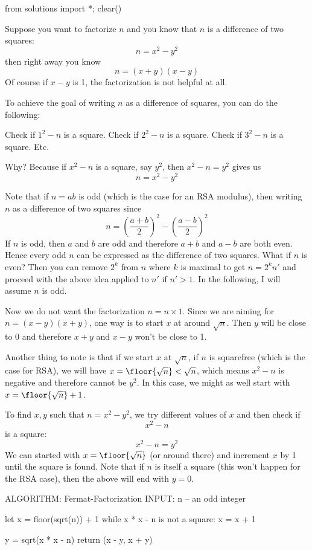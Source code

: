 \begin{python0}
from solutions import *; clear()
\end{python0}

Suppose you want to factorize $n$ and you know that
$n$ is a difference of two squares:
\[
n = x^2 - y^2
\]
then right away you know
\[
n = (x + y)(x - y)
\]
Of course if $x - y$ is 1, the factorization is not
helpful at all.

To achieve the goal of writing $n$ as a difference of squares,
you can do the following:
\begin{tightlist}
  \li Check if $1^2 - n$ is a square.
  \li Check if $2^2 - n$ is a square.
  \li Check if $3^2 - n$ is a square.
  \li Etc.
\end{tightlist}
Why?
Because if $x^2 - n$ is a square, say $y^2$, then
$x^2 - n = y^2$ gives us
\[
n = x^2 - y^2
\]

Note that if $n = ab$ is odd (which is the case for an RSA modulus),
then writing $n$ as a difference of two squares since
\[
  n
  =
  \left(\frac{a + b}{2}\right)^2
  -
  \left(\frac{a - b}{2}\right)^2
\]
If $n$ is odd, then $a$ and $b$ are odd and
therefore $a + b$ and $a - b$ are both even.
Hence every odd $n$ can be expressed as the
difference of two squares.
What if $n$ is even?
Then you can remove $2^k$ from $n$
where $k$ is maximal to get
$n = 2^k n'$ and proceed with the above
idea applied to $n'$ if $n' > 1$.
In the following, I will assume $n$ is odd.

Now we do not want the factorization $n = n \times 1$.
Since we are aiming for $n = (x-y)(x+y)$,
one way is to start $x$ at around $\sqrt{n}$.
Then $y$ will be close to $0$ and therefore $x+y$ and $x-y$ won't be close to 1.

Another thing to note is that if we start $x$ at $\sqrt{n}$,
if $n$ is squarefree (which is the case for RSA),
we will have $x = \floor{\sqrt{n}} < \sqrt{n}$,
which means $x^2 - n$ is negative and therefore cannot be $y^2$.
In this case, we might as well start with
$x = \floor{\sqrt{n}} + 1$.

To find $x,y$ such that $n = x^2 - y^2$,
we try different values of $x$ and then check if
\[
  x^2 - n
\]
is a square:
\[
  x^2 - n = y^2
\]
We can started with $x = \floor{\sqrt{n}}$ (or around there) and increment $x$ by 1 until
the square is found.
Note that if $n$ is itself a square (this won't happen for the RSA case),
then the above will end with $y = 0$.

\begin{console}[fontsize=\footnotesize]
ALGORITHM: Fermat-Factorization
INPUT: n -- an odd integer

let x = floor(sqrt(n)) + 1
while x * x - n is not a square:
    x = x + 1

y = sqrt(x * x - n)
return (x - y, x + y)    
\end{console}


